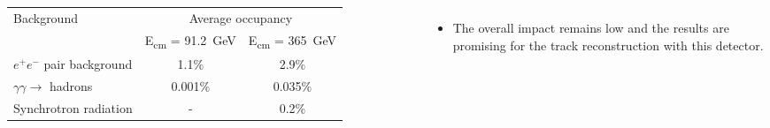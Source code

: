 \documentclass[final,xcolor={dvipsnames,svgnames,x11names,table}]{beamer}
\begin{document}
\begin{frame}
\begin{textblock}{50}
\begin{tcolorbox}[title=3 main sources of beam-induced backgrounds at the top stage]
\begin{columns}
    \begin{tabular}{l c c}
      \toprule
       Background & \multicolumn{2}{c}{Average occupancy} \\
        & E\textsubscript{cm} = 91.2~GeV &  E\textsubscript{cm} = 365~GeV \\
       \midrule
       $e^+e^-$ pair background & 1.1\% & 2.9\% \\
       $\gamma\gamma\rightarrow$ hadrons & 0.001\% & 0.035\%  \\
       Synchrotron radiation & - & 0.2\% \\
       \bottomrule
    \end{tabular}

    \begin{itemize}
      \item The overall impact remains low and the results are promising for the track reconstruction with this detector.
    \end{itemize}

  \end{columns}

  \end{tcolorbox}
\end{textblock}

\end{frame}
\end{document}
